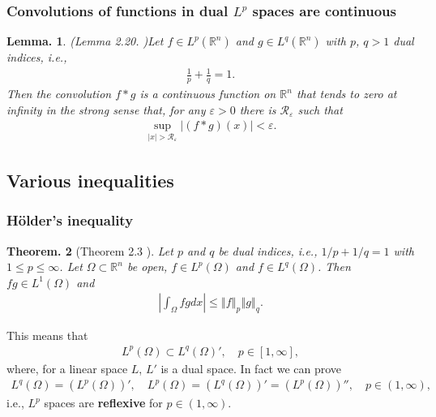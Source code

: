 \documentclass[openany, a4paper, oneside]{jsbook}
\theoremstyle{break}
\theoremstyle{breakdefn}
\newtheorem{thm}{Theorem.}[section]
\newtheorem{lem}[thm]{Lemma.}
\newcommand{\abs}[1]{\left|#1\right|}
\newcommand{\norm}[1]{\left\Vert#1\right\Vert}
\newcommand{\rbk}[1]{\left (#1\right)}
\newcommand{\bbRn}{\mathbb{R}^n}
\newcommand{\calR}{\mathcal{R}}
\begin{document}
\subsubsection{Convolutions of functions in dual $L^p$ spaces are continuous}


      \begin{lem}\textup{(Lemma 2.20. \cite{LiebLoss1})}\label{Lieb-Loss_Analysis_chap11_41}
 Let $f \in L^p \rbk{\bbRn}$ and $g \in L^q (\bbRn)$ with $p$, $q > 1$ dual indices, i.e.,
 \begin{align}
  \frac{1}{p} + \frac{1}{q} = 1.
 \end{align}
 Then the convolution $f*g$ is a continuous function on $\bbRn$ that tends to zero at infinity in the strong sense that,
 for any $\varepsilon > 0$ there is $\calR_{\varepsilon}$ such that
 \begin{align}
  \sup_{\abs{x} > \calR_{\varepsilon}} \abs{(f*g) (x)} < \varepsilon.
 \end{align}
\end{lem}
\subsection{Various inequalities}

\subsubsection{H\"older's inequality}


\begin{thm}[Theorem 2.3 \cite{LiebLoss1}]
 Let $p$ and $q$ be dual indices, i.e., $1/p + 1/q = 1$ with $1 \leq p \leq \infty$.
 Let $\Omega \subset \bbRn$ be open, $f \in L^p (\Omega)$ and $f \in L^q \rbk{\Omega}$.
 Then $fg \in L^1 (\Omega)$ and
 \begin{align}
  \abs{\int_{\Omega} fg dx}
  \leq
  \norm{f}_p \norm{g}_q.
 \end{align}
\end{thm}
This means that
\begin{align}
 L^p \rbk{\Omega} \subset L^q \rbk{\Omega}', \quad p \in [1, \infty],
\end{align}
where, for a linear space $L$, $L'$ is a dual space.
In fact we can prove
\begin{align}
 L^q \rbk{\Omega} = \rbk{L^p \rbk{\Omega}}', \quad
 L^p \rbk{\Omega} = \rbk{L^q \rbk{\Omega}}' = \rbk{L^p \rbk{\Omega}}'', \quad
 p \in (1, \infty),
\end{align}
i.e., $L^p$ spaces are \textbf{reflexive} for $p \in (1, \infty)$.
\end{document}

